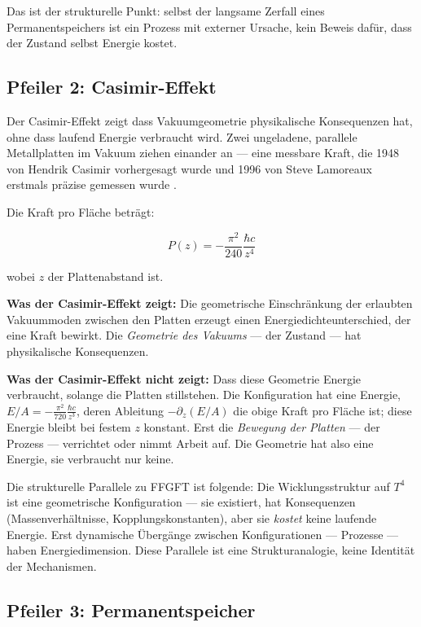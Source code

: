 Das ist der strukturelle Punkt: selbst der langsame Zerfall eines
Permanentspeichers ist ein Prozess mit externer Ursache, kein
Beweis dafür, dass der Zustand selbst Energie kostet.

\subsection{Pfeiler 2: Casimir-Effekt}

Der Casimir-Effekt zeigt dass Vakuumgeometrie physikalische Konsequenzen
hat, ohne dass laufend Energie verbraucht wird.
Zwei ungeladene, parallele Metallplatten im Vakuum ziehen einander an —
eine messbare Kraft, die 1948 von Hendrik Casimir vorhergesagt wurde
\cite{Casimir1948} und 1996 von Steve Lamoreaux erstmals präzise gemessen
wurde \cite{Lamoreaux1997}.

Die Kraft pro Fläche beträgt:

\begin{equation}
  P(z) = -\frac{\pi^2}{240}\frac{\hbar c}{z^4}
\end{equation}

wobei $z$ der Plattenabstand ist.

\textbf{Was der Casimir-Effekt zeigt:} Die geometrische Einschränkung der
erlaubten Vakuummoden zwischen den Platten erzeugt einen Energiedichteunterschied,
der eine Kraft bewirkt. Die \emph{Geometrie des Vakuums} — der Zustand — hat
physikalische Konsequenzen.

\textbf{Was der Casimir-Effekt nicht zeigt:} Dass diese Geometrie Energie
verbraucht, solange die Platten stillstehen. Die Konfiguration hat eine
Energie, $E/A = -\frac{\pi^2}{720}\frac{\hbar c}{z^3}$, deren Ableitung
$-\partial_z(E/A)$ die obige Kraft pro Fläche ist; diese Energie bleibt bei
festem $z$ konstant. Erst die
\emph{Bewegung der Platten} — der Prozess — verrichtet oder nimmt Arbeit auf.
Die Geometrie hat also eine Energie, sie verbraucht nur keine.

Die strukturelle Parallele zu FFGFT ist folgende: Die Wicklungsstruktur
auf $T^4$ ist eine geometrische Konfiguration — sie existiert, hat
Konsequenzen (Massenverhältnisse, Kopplungskonstanten), aber sie
\emph{kostet} keine laufende Energie. Erst dynamische Übergänge zwischen
Konfigurationen — Prozesse — haben Energiedimension. Diese Parallele ist
eine Strukturanalogie, keine Identität der Mechanismen.

\subsection{Pfeiler 3: Permanentspeicher}

